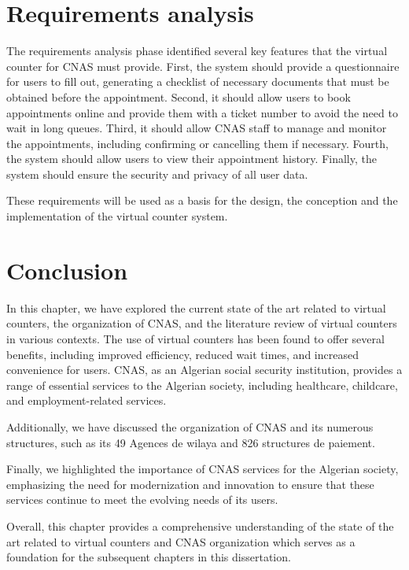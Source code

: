 \section{Requirements analysis}
The requirements analysis phase identified several key features that the virtual counter for CNAS must provide. First, the system should provide a questionnaire for users to fill out, generating a checklist of necessary documents that must be obtained before the appointment. Second, it should allow users to book appointments online and provide them with a ticket number to avoid the need to wait in long queues. Third, it should allow CNAS staff to manage and monitor the appointments, including confirming or cancelling them if necessary. Fourth, the system should allow users to view their appointment history. Finally, the system should ensure the security and privacy of all user data. 
\medskip 

These requirements will be used as a basis for the design, the conception and the implementation of the virtual counter system.
\newpage
\section{Conclusion}
In this chapter, we have explored the current state of the art related to virtual counters, the organization of CNAS, and the literature review of virtual counters in various contexts. The use of virtual counters has been found to offer several benefits, including improved efficiency, reduced wait times, and increased convenience for users. CNAS, as an Algerian social security institution, provides a range of essential services to the Algerian society, including healthcare, childcare, and employment-related services.

Additionally, we have discussed the organization of CNAS and its numerous structures, such as its 49 Agences de wilaya and 826 structures de paiement. 
\medskip

Finally, we highlighted the importance of CNAS services for the Algerian society, emphasizing the need for modernization and innovation to ensure that these services continue to meet the evolving needs of its users.

Overall, this chapter provides a comprehensive understanding of the state of the art related to virtual counters and CNAS organization which serves as a foundation for the subsequent chapters in this dissertation.

